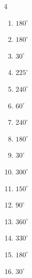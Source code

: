 \begin{multicols}{4}
\begin{enumerate}
  \item $\displaystyle 180^{\circ}$
        \phantom{$\displaystyle =\pi$}

\columnbreak %

  \item $\displaystyle 180^{\circ}$
        \phantom{$\displaystyle =\pi$}

  \item $\displaystyle 30^{\circ}$

  \item $\displaystyle 225^{\circ}$

  \item $\displaystyle 240^{\circ}$

  \item $\displaystyle 60^{\circ}$

  \item $\displaystyle 240^{\circ}$

  \item $\displaystyle 180^{\circ}$
        \phantom{$\displaystyle =\pi$}

  \item $\displaystyle 30^{\circ}$

  \item $\displaystyle 300^{\circ}$

  \item $\displaystyle 150^{\circ}$

  \item $\displaystyle 90^{\circ}$

  \item $\displaystyle 360^{\circ}$
        \phantom{$\displaystyle =2\pi$}

  \item $\displaystyle 330^{\circ}$

  \item $\displaystyle 180^{\circ}$
        \phantom{$\displaystyle =\pi$}

  \item $\displaystyle 30^{\circ}$


\end{enumerate}
\end{multicols}
